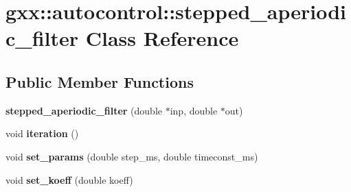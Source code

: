 \hypertarget{classgxx_1_1autocontrol_1_1stepped__aperiodic__filter}{}\section{gxx\+:\+:autocontrol\+:\+:stepped\+\_\+aperiodic\+\_\+filter Class Reference}
\label{classgxx_1_1autocontrol_1_1stepped__aperiodic__filter}
\subsection*{Public Member Functions}
\begin{DoxyCompactItemize}
\item 
{\bfseries stepped\+\_\+aperiodic\+\_\+filter} (double $\ast$inp, double $\ast$out)\hypertarget{classgxx_1_1autocontrol_1_1stepped__aperiodic__filter_ac8d5fd638c424623f4be2962dbcd3cba}{}\label{classgxx_1_1autocontrol_1_1stepped__aperiodic__filter_ac8d5fd638c424623f4be2962dbcd3cba}

\item 
void {\bfseries iteration} ()\hypertarget{classgxx_1_1autocontrol_1_1stepped__aperiodic__filter_a4f66bb77bb262bafe824cb97cf6d61a6}{}\label{classgxx_1_1autocontrol_1_1stepped__aperiodic__filter_a4f66bb77bb262bafe824cb97cf6d61a6}

\item 
void {\bfseries set\+\_\+params} (double step\+\_\+ms, double timeconst\+\_\+ms)\hypertarget{classgxx_1_1autocontrol_1_1stepped__aperiodic__filter_a5a36bc11ceb5fbda7ae551f92e2ab87f}{}\label{classgxx_1_1autocontrol_1_1stepped__aperiodic__filter_a5a36bc11ceb5fbda7ae551f92e2ab87f}

\item 
void {\bfseries set\+\_\+koeff} (double koeff)\hypertarget{classgxx_1_1autocontrol_1_1stepped__aperiodic__filter_a7ac14acc2e1e52f67073984dc64ce5e6}{}\label{classgxx_1_1autocontrol_1_1stepped__aperiodic__filter_a7ac14acc2e1e52f67073984dc64ce5e6}

\end{DoxyCompactItemize}
